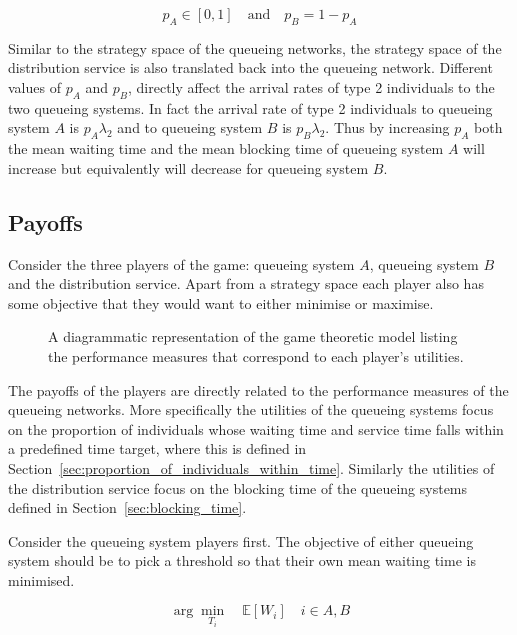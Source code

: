 \begin{equation}\label{eq:game_strategy_space_distribution_service_simplified}
    p_A \in [0, 1] \quad \text{and} \quad p_B = 1 - p_A
\end{equation}

Similar to the strategy space of the queueing networks, the strategy space of
the distribution service is also translated back into the queueing network.
Different values of \(p_A\) and \(p_B\), directly affect the arrival rates of
type 2 individuals to the two queueing systems.
In fact the arrival rate of type 2 individuals to queueing system \(A\) is
\(p_A \lambda_2\) and to queueing system \(B\) is \(p_B \lambda_2\).
Thus by increasing \(p_A\) both the mean waiting time and the mean blocking time
of queueing system \(A\) will increase but equivalently will decrease for
queueing system \(B\).


\subsection{Payoffs}

Consider the three players of the game: queueing system \(A\), queueing system
\(B\) and
the distribution service.
Apart from a strategy space each player also has some objective that they would
want to either minimise or maximise.

\begin{figure}[H]
    
    \caption{A diagrammatic representation of the game theoretic model listing
    the performance measures that correspond to each player's utilities.}
    \label{fig:diagram_of_game_theoretic_model_objectives}
\end{figure}


The payoffs of the players are directly related to the performance measures of
the queueing networks.
More specifically the utilities of the queueing systems focus on the proportion
of individuals whose waiting time and service time falls within a predefined
time target, where this is defined in
Section~\ref{sec:proportion_of_individuals_within_time}.
Similarly the utilities of the distribution service focus on the blocking time
of the queueing systems defined in Section~\ref{sec:blocking_time}.

Consider the queueing system players first.
The objective of either queueing system should be to pick a threshold so that
their own mean waiting time is minimised.

\begin{equation}\label{eq:game_theoretic_alternative_objective_queueing_system_A}
    \arg \min_{T_i} \quad \mathbb{E}[W_i] \quad i \in {A, B}
\end{equation}

